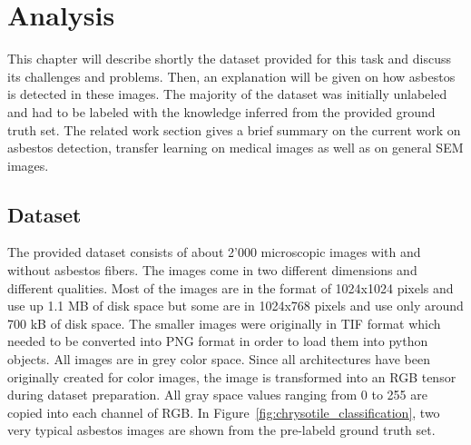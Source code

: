 \chapter{Analysis}

This chapter will describe shortly the dataset provided for this task and discuss its challenges and problems. Then, an explanation will be given on how asbestos is detected in these images. The majority of the dataset was initially unlabeled and had to be labeled with the knowledge inferred from the provided ground truth set. The related work section gives a brief summary on the current work on asbestos detection, transfer learning on medical images as well as on general SEM images.

\section{Dataset}


The provided dataset consists of about 2'000 microscopic images with and without asbestos fibers. The images come in two different dimensions and different qualities. Most of the images are in the format of 1024x1024 pixels and use up 1.1 MB of disk space but some are in 1024x768 pixels and use only around 700 kB of disk space. The smaller images were originally in TIF format which needed to be converted into PNG format in order to load them into python objects. All images are in grey color space. Since all architectures have been originally created for color images, the image is transformed into an RGB tensor during dataset preparation. All gray space values ranging from 0 to 255 are copied into each channel of RGB. In Figure~\ref{fig:chrysotile_classification}, two very typical asbestos images are shown from the pre-labeld ground truth set.

